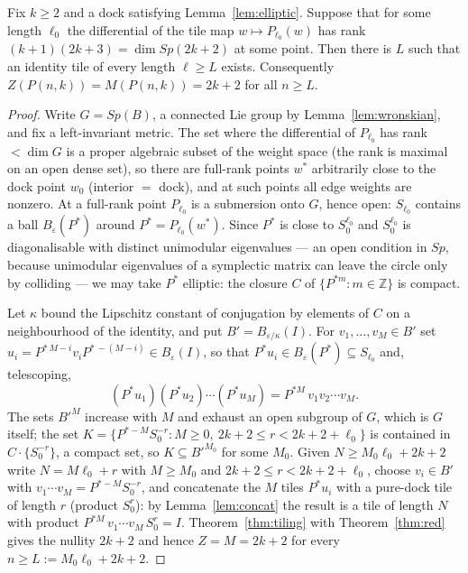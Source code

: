 \begin{theorem}\label{thm:tilesallk}
Fix $k\ge2$ and a dock satisfying Lemma~\ref{lem:elliptic}. Suppose that for
some length $\ell_0$ the differential of the tile map $w\mapsto P_{\ell_0}(w)$ has
rank $(k+1)(2k+3)=\dim Sp(2k+2)$ at some point. Then there is $L$ such that an
identity tile of every length $\ell\ge L$ exists. Consequently
$Z(P(n,k))=M(P(n,k))=2k+2$ for all $n\ge L$.
\end{theorem}

\begin{proof}
Write $G=Sp(B)$, a connected Lie group by Lemma~\ref{lem:wronskian}, and fix a
left-invariant metric. The set where the differential of $P_{\ell_0}$ has rank
$<\dim G$ is a proper algebraic subset of the weight space (the rank is
maximal on an open dense set), so there are full-rank points $w^*$ arbitrarily
close to the dock point $w_0$ (interior $=$ dock), and at such points all edge
weights are nonzero. At a full-rank point $P_{\ell_0}$ is a submersion onto $G$,
hence open: $S_{\ell_0}$ contains a ball $B_\varepsilon(P^*)$ around
$P^*=P_{\ell_0}(w^*)$. Since $P^*$ is close to $S_0^{\ell_0}$ and
$S_0^{\ell_0}$ is diagonalisable with distinct unimodular eigenvalues --- an
open condition in $Sp$, because unimodular eigenvalues of a symplectic matrix
can leave the circle only by colliding --- we may take $P^*$ elliptic: the
closure $C$ of $\{P^{*m}:m\in\mathbb Z\}$ is compact.

Let $\kappa$ bound the Lipschitz constant of conjugation by elements of $C$ on
a neighbourhood of the identity, and put $B'=B_{\varepsilon/\kappa}(I)$. For
$v_1,\dots,v_M\in B'$ set $u_i=P^{*\,M-i}v_iP^{*\,-(M-i)}\in B_\varepsilon(I)$,
so that $P^*u_i\in B_\varepsilon(P^*)\subseteq S_{\ell_0}$ and, telescoping,
\[
  (P^*u_1)(P^*u_2)\cdots(P^*u_M)=P^{*M}\,v_1v_2\cdots v_M .
\]
The sets $B'^M$ increase with $M$ and exhaust an open subgroup of $G$, which is
$G$ itself; the set $K=\{P^{*-M}S_0^{-r}: M\ge0,\ 2k+2\le r<2k+2+\ell_0\}$ is
contained in $C\cdot\{S_0^{-r}\}$, a compact set, so $K\subseteq B'^{M_0}$ for
some $M_0$. Given $N\ge M_0\ell_0+2k+2$ write $N=M\ell_0+r$ with $M\ge M_0$ and
$2k+2\le r<2k+2+\ell_0$, choose $v_i\in B'$ with $v_1\cdots v_M=P^{*-M}S_0^{-r}$,
and concatenate the $M$ tiles $P^*u_i$ with a pure-dock tile of length $r$
(product $S_0^{r}$): by Lemma~\ref{lem:concat} the result is a tile of length
$N$ with product $P^{*M}\,v_1\cdots v_M\,S_0^{r}=I$. Theorem~\ref{thm:tiling}
with Theorem~\ref{thm:red} gives the nullity $2k+2$ and hence
$Z=M=2k+2$ for every $n\ge L:=M_0\ell_0+2k+2$.
\end{proof}

